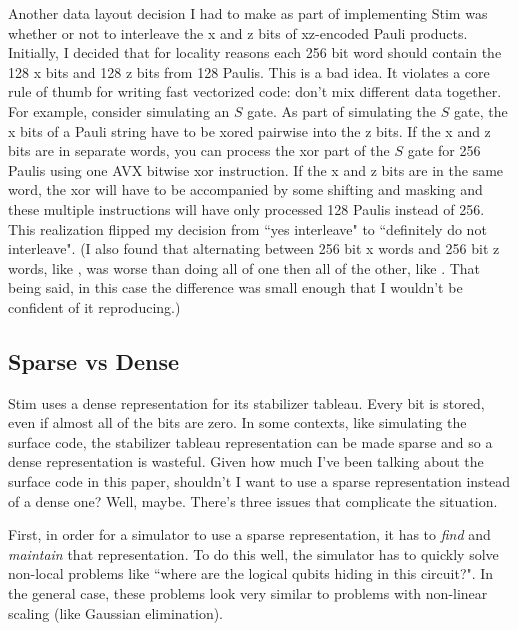 \documentclass[onecolumn,unpublished]{quantumarticle}
\theoremstyle{definition}
\theoremstyle{definition}
\theoremstyle{definition}
\begin{document}
Another data layout decision I had to make as part of implementing Stim was whether or not to interleave the x and z bits of xz-encoded Pauli products.
Initially, I decided that for locality reasons each 256 bit word should contain the 128 x bits and 128 z bits from 128 Paulis.
This is a bad idea.
It violates a core rule of thumb for writing fast vectorized code: don't mix different data together.
For example, consider simulating  an $S$ gate.
As part of simulating the $S$ gate, the x bits of a Pauli string have to be xored pairwise into the z bits.
If the x and z bits are in separate words, you can process the xor part of the $S$ gate for 256 Paulis using one AVX bitwise xor instruction.
If the x and z bits are in the same word, the xor will have to be accompanied by some shifting and masking and these multiple instructions will have only processed 128 Paulis instead of 256.
This realization flipped my decision from ``yes interleave" to ``definitely do not interleave".
(I also  found that alternating between 256 bit x words and 256 bit z words, like , was worse than doing all of one then all of the other, like .
That being said, in this case the difference was small enough that I wouldn't be confident of it reproducing.)

\subsection{Sparse vs Dense}
\label{sec:sparsevdense}

Stim uses a dense representation for its stabilizer tableau.
Every bit is stored, even if almost all of the bits are zero.
In some contexts, like simulating the surface code, the stabilizer tableau representation can be made sparse and so a dense representation is wasteful.
Given how much I've been talking about the surface code in this paper, shouldn't I want to use a sparse representation instead of a dense one?
Well, maybe.
There's three issues that complicate the situation.

First, in order for a simulator to use a sparse representation, it has to {\em find} and {\em maintain} that representation.
To do this well, the simulator has to quickly solve non-local problems like ``where are the logical qubits hiding in this circuit?".
In the general case, these problems look very similar to problems with non-linear scaling (like Gaussian elimination).
\end{document}
